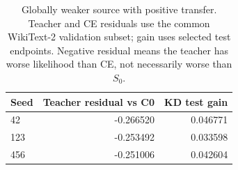 \begin{table}[htbp]
\centering\small
\begin{tabular}{lrr}
\toprule
Seed & Teacher residual vs C0 & KD test gain \\
\midrule
42 & -0.266520 & 0.046771 \\
123 & -0.253492 & 0.033598 \\
456 & -0.251006 & 0.042604 \\
\bottomrule
\end{tabular}
\caption{Globally weaker source with positive transfer. Teacher and CE residuals use the common WikiText-2 validation subset; gain uses selected test endpoints. Negative residual means the teacher has worse likelihood than CE, not necessarily worse than $S_0$.}
\label{tab:weaker_teacher}
\end{table}
